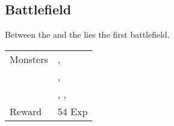 \subsection{Battlefield}
\label{map:battlefield_01}

Between the  and the  lies the first battlefield. 

\begin{longtable}{ l p{9cm} }
	Monsters
	& \nameref{monster:mad_plant}, \nameref{monster:poison_toad} \\
	& \nameref{monster:mad_plant}, \nameref{monster:mad_plant} \\
	& \nameref{monster:mad_plant}, \nameref{monster:mad_plant}, \nameref{monster:mad_plant}
\\
	Reward & 54 Exp
\end{longtable}
